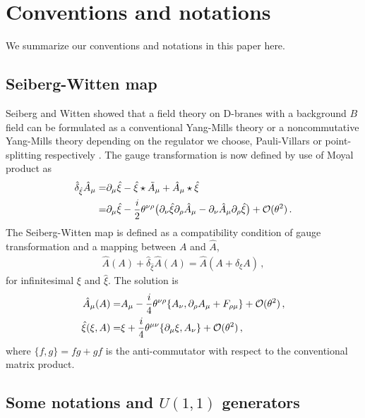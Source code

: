 \documentclass[11pt]{article}
\newcommand{\nn}{\nonumber}
\numberwithin{equation}{section}
\begin{document}
\appendix





\section{Conventions and notations}
\label{sec:conventions}

We summarize our conventions and notations in this paper here.

\subsection{Seiberg-Witten map}
\label{sec:seiberg-witten-map}

Seiberg and Witten showed that a field theory on D-branes with a background $B$ field
can be formulated as a conventional Yang-Mills theory or a noncommutative Yang-Mills theory
depending on the regulator we choose, Pauli-Villars or point-splitting respectively \cite{Seiberg:1999vs}.
The gauge transformation is now defined by use of Moyal product as
\begin{align}
  \hat{\delta}_{\hat{\xi}} \hat{A}_\mu =&
\partial_\mu \hat{\xi} -  \hat{\xi} \star \tilde{A}_\mu + \hat{A}_\mu \star \hat{\xi}
\nn\\=&
\partial_\mu \hat{\xi} 
-\frac{i}{2} \theta^{\nu\rho} \big( \partial_\nu \hat{\xi} \partial_\rho \hat{A}_\mu
-\partial_\nu \hat{A}_\mu \partial_\rho \hat{\xi}  \big)
+{\cal O}(\theta^2) 
 \,.
\end{align}
The Seiberg-Witten map is defined as a compatibility condition of
gauge transformation and a mapping between $A$ and $\hat{A}$,
\begin{align}
  \hat{A}(A)+ \hat{\delta}_{\hat{\xi}} \hat{A}(A) =
\hat{A}(A+\delta_\xi A) \,,
\label{eq:SW_gaugeRel}
\end{align}
for infinitesimal $\xi$ and $\hat{\xi}$.
The solution is
\begin{align}
  \hat{A}_\mu(A)=& A_\mu - \frac{i }{4}\theta^{\nu\rho}  \{ A_\nu, \partial_\rho A_\mu + F_{\rho\mu} \}
+{\cal O}(\theta^2)
\label{eq:SWmap1}
 \,,\\
\hat{\xi}(\xi,A)=& \xi + \frac{i }{4}\theta^{\mu\nu} \{ \partial_\mu \xi , A_\nu \}
+ {\cal O}(\theta^2) \,,
\end{align}
where $\{ f, g\}=fg + gf$ is the anti-commutator with respect to the conventional matrix product.


\subsection{Some notations and $U(1,1)$ generators}
\end{document}
